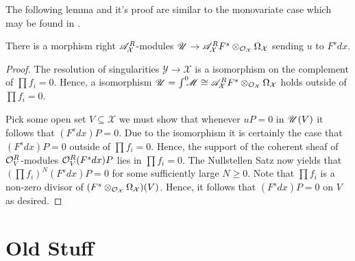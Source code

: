 The following lemma and it's proof are similar to the monovariate case which may be found in \cite[p246]{bjork1979rings}.
\begin{lemma}
  There is a morphism right $\mathscr{A}_\mathcal{X}^R$-modules $\mathscr{U}\to \mathscr{A}_\mathcal{X}^RF^s \otimes_{\mathcal{O}_\mathcal{X}}\Omega_\mathcal{X}$ sending $u$ to $F^sdx$.
\end{lemma}
\begin{proof}
   The resolution of singularities $\mathcal{Y}\to \mathcal{X}$ is a isomorphism on the complement of $\prod f_i = 0$. Hence, a isomorphism $\mathscr{U} = \int^0 \mkern -8mu \mathscr{M} \cong  \mathscr{A}_\mathcal{X}^RF^s  \otimes_{\mathcal{O}_\mathcal{X}}\Omega_\mathcal{X}$ holds outside of $\prod f_i = 0$.

  Pick some open set $V\subseteq \mathcal{X}$ we must show that whenever $uP = 0$ in $\mathscr{U}(V)$ it follows that $(F^s dx)P = 0$.
  Due to the isomorphism it is certainly the case that $(F^s dx) P = 0$ outside of $\prod f_i = 0$.
  Hence, the support of the coherent sheaf of $\mathcal{O}_V^R$-modules $\mathcal{O}_V^R (F^s dx) P $ lies in $\prod f_i = 0$.
  The Nullstellen Satz now yields that $(\prod f_i)^N (F^s dx) P  = 0$ for some sufficiently large $N\geq 0$.
  Note that $\prod f_i$ is a non-zero divisor of $(F^s\otimes_{\mathcal{O}_\mathcal{X}} \Omega_\mathcal{X})(V)$. Hence, it follows that $(F^s dx) P= 0$ on $V$ as desired.
\end{proof}
\newpage
\section{Old Stuff}
